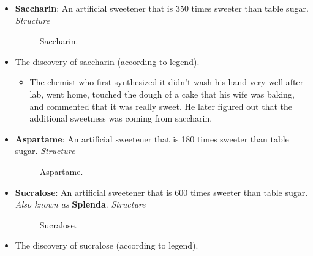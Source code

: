 \documentclass[../notes.tex]{subfiles}
\begin{document}
\begin{itemize}
\begin{figure}[h!]
{        ))-[:170,1.207](-[:-70,0.8]OH)-[:-160,1.207](-[:160,0.8]HO)-[:130,1.207](-[:-160,0.8]HO)-[:-10,1.207](-[:110,0.8]-[:40,0.8]OH)}
        \caption{Sucrose.}
        \label{fig:sucrose}
    \end{figure}
    \item \textbf{Saccharin}: An artificial sweetener that is 350 times sweeter than table sugar. \emph{Structure}
    \begin{figure}[h!]
        \centering
        \footnotesize
        \caption{Saccharin.}
        \label{fig:saccharin}
    \end{figure}
    \item The discovery of saccharin (according to legend).
    \begin{itemize}
        \item The chemist who first synthesized it didn't wash his hand very well after lab, went home, touched the dough of a cake that his wife was baking, and commented that it was really sweet. He later figured out that the additional sweetness was coming from saccharin.
    \end{itemize}
    \item \textbf{Aspartame}: An artificial sweetener that is 180 times sweeter than table sugar. \emph{Structure}
    \begin{figure}[H]
        \centering
        \footnotesize
        \caption{Aspartame.}
        \label{fig:aspartame}
    \end{figure}
    \item \textbf{Sucralose}: An artificial sweetener that is 600 times sweeter than table sugar. \emph{Also known as} \textbf{Splenda}. \emph{Structure}
    \begin{figure}[h!]
        \centering
        \footnotesize
        \caption{Sucralose.}
        \label{fig:sucralose}
    \end{figure}
    \item The discovery of sucralose (according to legend).
    \begin{itemize}

\end{itemize}
\end{itemize}
\end{document}
